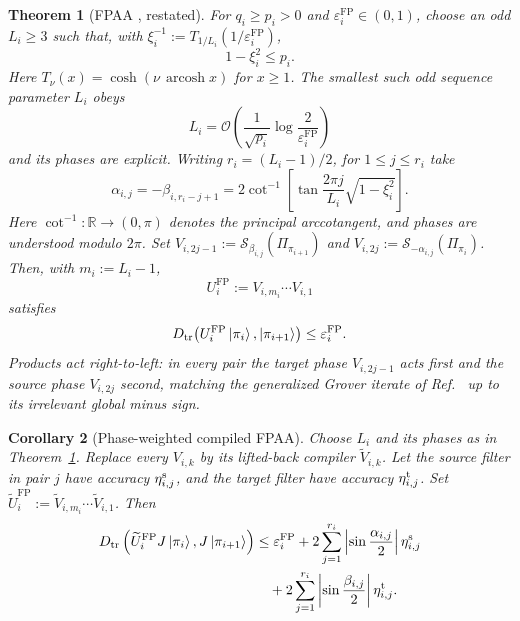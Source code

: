 \documentclass[10pt,conference]{IEEEtran}
\theoremstyle{plain}
\newtheorem{theorem}{Theorem}[section]
\newtheorem{corollary}[theorem]{Corollary}
\theoremstyle{remark}
\begin{document}
\begin{theorem}[FPAA \cite{Yoder_2014}, restated]
\label{thm:fpaa-ideal}
For \(q_i\geq p_i>0\) and
\(\varepsilon_i^{\mathrm{FP}}\in(0,1)\), choose an odd \(L_i\geq3\)
such that, with
\(\xi_i^{-1}:=T_{1/L_i}(1/\varepsilon_i^{\mathrm{FP}})\),
\begin{equation}
1-\xi_i^2\leq p_i .
\label{eq:yoder-width}
\end{equation}
Here \(T_\nu(x)=\cosh(\nu\,\operatorname{arcosh}x)\) for \(x\geq1\).
The smallest such odd sequence parameter \(L_i\) obeys
\begin{equation}
L_i = \mathcal{O}\!\left(\frac{1}{\sqrt{p_i}}\log\frac{2}{\varepsilon_i^{\mathrm{FP}}}\right)
\end{equation}
and its phases are explicit.  Writing
\(r_i=(L_i-1)/2\), for \(1\leq j\leq r_i\) take
\begin{equation}
\alpha_{i,j}=-\beta_{i,r_i-j+1}
=2\cot^{-1}\!\left[
\tan\frac{2\pi j}{L_i}\sqrt{1-\xi_i^2}\right].
\label{eq:yoder-phases}
\end{equation}
Here \(\cot^{-1}\colon\mathbb R\to(0,\pi)\) denotes the principal
arccotangent, and phases are understood modulo \(2\pi\).
Set
\(V_{i,2j-1}:=\mathcal S_{\beta_{i,j}}(\Pi_{\pi_{i+1}})\)
and
\(V_{i,2j}:=\mathcal S_{-\alpha_{i,j}}(\Pi_{\pi_i})\).
Then, with \(m_i:=L_i-1\),
\begin{equation}
U_i^{\mathrm{FP}}:=V_{i,m_i}\cdots V_{i,1}
\end{equation}
satisfies
\[
D_{\mathrm{tr}}\bigl(U_i^{\mathrm{FP}}\ket{\pi_i},
\ket{\pi_{i+1}}\bigr)\leq\varepsilon_i^{\mathrm{FP}}.
\]
Products act right-to-left: in every pair the target phase
\(V_{i,2j-1}\) acts first and the source phase \(V_{i,2j}\) second,
matching the generalized Grover iterate of Ref.~\cite{Yoder_2014}
up to its irrelevant global minus sign.
\end{theorem}

\begin{corollary}[Phase-weighted compiled FPAA]
\label{cor:gqsp_fpaa}
Choose \(L_i\) and its phases as in
Theorem~\ref{thm:fpaa-ideal}.  Replace every \(V_{i,k}\) by its
lifted-back compiler \(\widetilde V_{i,k}\).  Let the source filter in
pair \(j\) have accuracy \(\eta_{i,j}^{\rm s}\), and the target
filter have accuracy \(\eta_{i,j}^{\rm t}\).  Set
\(\widetilde U_i^{\mathrm{FP}}
:=\widetilde V_{i,m_i}\cdots\widetilde V_{i,1}\).  Then
\begin{align}
D_{\mathrm{tr}}\left(
\widetilde U_i^{\mathrm{FP}}J\ket{\pi_i},
J\ket{\pi_{i+1}}\right)
&\leq\varepsilon_i^{\mathrm{FP}}
+2\sum_{j=1}^{r_i}
\left|\sin\frac{\alpha_{i,j}}2\right|\eta_{i,j}^{\rm s}
\nonumber\\
&\quad
+2\sum_{j=1}^{r_i}
\left|\sin\frac{\beta_{i,j}}2\right|\eta_{i,j}^{\rm t}.
\label{eq:phase-weighted-fpaa}
\end{align}
\end{corollary}
\end{document}
